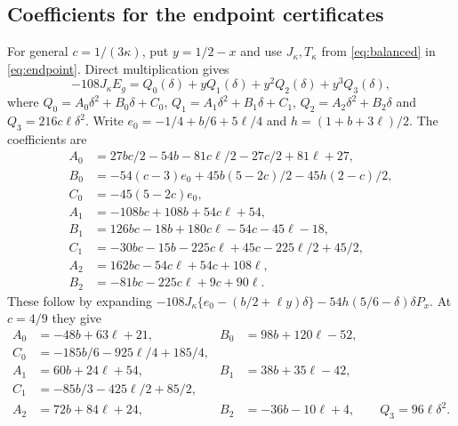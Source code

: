 \subsection{Coefficients for the endpoint certificates}\label{sec:coefficients}
For general $c=1/(3\kappa)$, put $y=1/2-x$ and use $J_\kappa,T_\kappa$ from \eqref{eq:balanced} in \eqref{eq:endpoint}. Direct multiplication gives
\[
 -108J_\kappa E_g
 =Q_0(\delta)+yQ_1(\delta)+y^2Q_2(\delta)+y^3Q_3(\delta),
\]
where $Q_0=A_0\delta^2+B_0\delta+C_0$,
$Q_1=A_1\delta^2+B_1\delta+C_1$, $Q_2=A_2\delta^2+B_2\delta$ and
$Q_3=216c\ell\delta^2$. Write $e_0=-1/4+b/6+5\ell/4$ and $h=(1+b+3\ell)/2$. The coefficients are
\begin{align*}
 A_0&=27bc/2-54b-81c\ell/2-27c/2+81\ell+27,\\
 B_0&=-54(c-3)e_0+45b(5-2c)/2-45h(2-c)/2,\\
 C_0&=-45(5-2c)e_0,\\
 A_1&=-108bc+108b+54c\ell+54,\\
 B_1&=126bc-18b+180c\ell-54c-45\ell-18,\\
 C_1&=-30bc-15b-225c\ell+45c-225\ell/2+45/2,\\
 A_2&=162bc-54c\ell+54c+108\ell,\\
 B_2&=-81bc-225c\ell+9c+90\ell.
\end{align*}
These follow by expanding
$-108J_\kappa\{e_0-(b/2+\ell y)\delta\}
-54h(5/6-\delta)\delta P_x$.
At $c=4/9$ they give
\begin{align*}
 A_0&=-48b+63\ell+21,&B_0&=98b+120\ell-52,\\
 C_0&=-185b/6-925\ell/4+185/4,\\
 A_1&=60b+24\ell+54,&B_1&=38b+35\ell-42,\\
 C_1&=-85b/3-425\ell/2+85/2,\\
 A_2&=72b+84\ell+24,&B_2&=-36b-10\ell+4,\qquad Q_3=96\ell\delta^2.
\end{align*}
